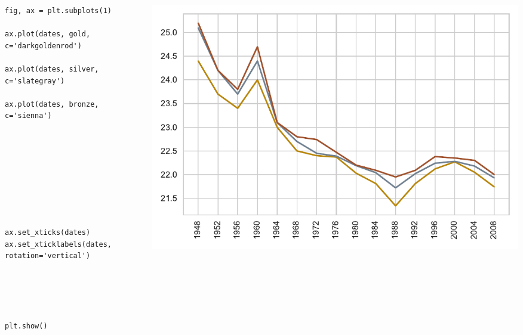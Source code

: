 \documentclass{beamer}
\begin{document}
\begin{frame}[fragile]
\tiny{
\begin{columns}
\begin{column}{0.45\textwidth}
\begin{verbatim}
fig, ax = plt.subplots(1)

ax.plot(dates, gold, c='darkgoldenrod')

ax.plot(dates, silver, c='slategray')

ax.plot(dates, bronze, c='sienna')









ax.set_xticks(dates)
ax.set_xticklabels(dates, rotation='vertical')





plt.show()
\end{verbatim}
\end{column}
\begin{column}{0.55\textwidth}
\includegraphics[width=\textwidth]{../olympics_3.pdf}
\end{column}
\end{columns}
}
\end{frame}
\end{document}
